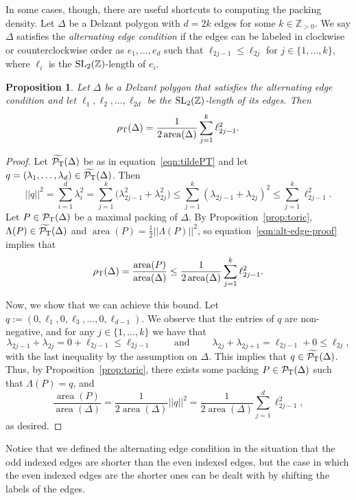 \documentclass[pdftex]{sigma}
\numberwithin{equation}{section}
\newtheorem{Proposition}[Theorem]{Proposition}
\def\Z{{\mathbb Z}}
\newcommand{\De}{\Delta}
\newcommand{\area}{\operatorname{area}}
\newcommand{\PT}{\mathcal{P}_{\rm T}}
\newcommand{\PTtilde}{\widetilde{\PT}}
\newcommand{\SL}{{\rm SL}_2(\Z)}
\begin{document}
In some cases, though, there are useful shortcuts to computing the packing density. Let $\De$ be a Delzant polygon with $d=2k$ edges for some $k\in\Z_{>0}$. We say $\De$ satisfies the \emph{alternating edge condition} if the edges can be labeled in clockwise or counterclockwise order as $e_1,\ldots,e_d$ such that $\ell_{2j-1} \leq \ell_{2j}$ for $j\in\{1,\ldots,k\}$, where $\ell_i$ is the $\SL$-length of $e_i$.

 \begin{Proposition}\label{prop:alt}
 Let $\De$ be a Delzant polygon that satisfies the alternating edge condition and let $\ell_1, \ell_2,\dots,\ell_{2d}$ be the $\SL$-length of its edges. Then
 \[\rho_{{\rm T}}(\De) = \frac{1}{2\area(\De)}\sum_{j=1}^k \ell_{2j-1}^2.\]
 \end{Proposition}

\begin{proof}
Let $\PTtilde(\De)$ be as in equation~\eqref{eqn:tildePT} and let $q=(\lambda_1,\ldots,\lambda_d)\in\PTtilde(\De)$.
Then
\begin{equation}\label{eqn:alt-edge-proof}
 ||q||^2
 = \sum_{i=1}^d \lambda_i^2
 = \sum_{j=1}^k \big(\lambda_{2j-1}^2 + \lambda_{2j}^2\big)
 \leq \sum_{j=1}^k (\lambda_{2j-1} + \lambda_{2j})^2
 \leq \sum_{j=1}^k \ell_{2j-1}^2.
\end{equation}
Let $P\in\PT(\De)$ be a maximal packing of $\De$. By Proposition~\ref{prop:toric}, $\Lambda(P)\in\PTtilde(\De)$ and $\area(P) = \frac{1}{2}||\Lambda(P)||^2$, so equation~\eqref{eqn:alt-edge-proof} implies that
 \[\rho_{{\rm T}}(\De) = \frac{\area(P)}{\area(\De)} \leq \frac{1}{2\area(\De)} \sum_{j=1}^k \ell_{2j-1}^2.\]

Now, we show that we can achieve this bound. Let $q := (0,\ell_1,0,\ell_3,\dots,0,\ell_{d-1})$. We observe that the entries of $q$ are non-negative, and for any $j\in\{1,\ldots,k\}$ we have that \[\lambda_{2j-1} + \lambda_{2j} = 0 + \ell_{2j-1} \leq \ell_{2j-1}\qquad\textrm{ and }\qquad \lambda_{2j} + \lambda_{2j+1} = \ell_{2j-1} + 0 \leq \ell_{2j},\] with the last inequality by the assumption on $\De$. This implies that $q \in \PTtilde(\De)$.
Thus, by Proposition~\ref{prop:toric}, there exists some packing $P\in\PT(\De)$ such that $\Lambda(P) = q$,
and
\[
 \frac{\area(P)}{\area(\De)} = \frac{1}{2\area(\De)}||q||^2 = \frac{1}{2\area(\De)}\sum_{j=1}^d \ell_{2j-1}^2,
\]
as desired.
\end{proof}

Notice that we defined the alternating edge condition in the situation that the odd indexed edges are shorter than the even indexed edges, but the case in which the even indexed edges are the shorter ones can be dealt with by shifting the labels of the edges.
\end{document}
